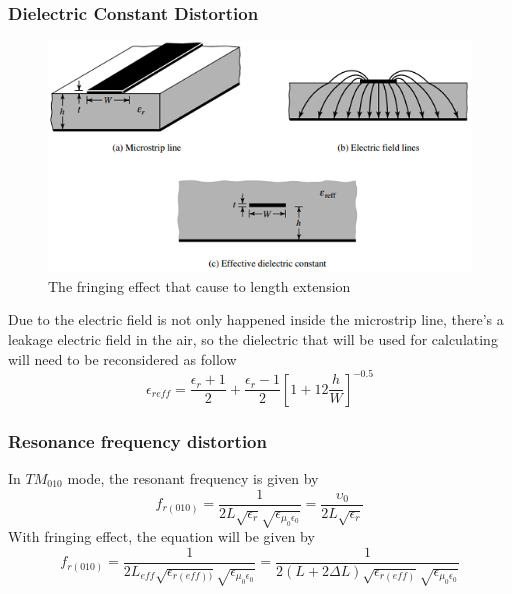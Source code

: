 \documentclass[11pt,a4paper,hidelinks]{article}
\begin{document}
    \subsubsection{Dielectric Constant Distortion}
      \begin{figure}[ht]
        \includegraphics{dielectivef.png}
        \centering
        \caption{The fringing effect that cause to length extension}
      \end{figure}
      \indent Due to the electric field is not only happened inside the microstrip line, there's a leakage electric field in the air,
              so the dielectric that will be used for calculating will need to be reconsidered as follow\cite{CoB:05}
      \begin{equation}
        \epsilon_{reff} = \frac{\epsilon_{r} + 1}{2} + \frac{\epsilon_{r} - 1}{2}[1 + 12\frac{h}{W}]^{-0.5}
      \end{equation}

    \subsubsection{Resonance frequency distortion}
        \indent In $TM_{010}$ mode, the resonant frequency is given by
        \begin{equation}  
          f_{r(010)} =  \frac{1}{2 L\sqrt{\epsilon_{r}}\sqrt{\epsilon_{\mu_{0}\epsilon_{0}}}}= \frac{\upsilon_{0}}{2L\sqrt{\epsilon_{r}}}
        \end{equation}
        \indent With fringing effect, the equation will be given by
        \begin{equation} 
          f_{r(010)} =  \frac{1}{2 L_{eff}\sqrt{\epsilon_{r(eff))}}\sqrt{\epsilon_{\mu_{0}\epsilon_{0}}}}=\frac{1}{2(L + 2\Delta L)\sqrt{\epsilon_{r(eff)}}\sqrt{\epsilon_{\mu_{0}\epsilon_{0}}}}
        \end{equation} 
  
\end{document}
